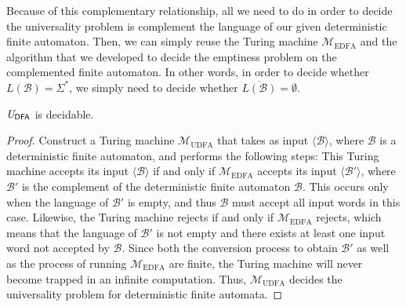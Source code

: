 Because of this complementary relationship, all we need to do in order to decide the universality problem is complement the language of our given deterministic finite automaton. Then, we can simply reuse the Turing machine $\mathcal{M}_{\mathrm{EDFA}}$ and the algorithm that we developed to decide the emptiness problem on the complemented finite automaton. In other words, in order to decide whether $L(\mathcal{B}) = \Sigma^{*}$, we simply need to decide whether $\overline{L(\mathcal{B})} = \emptyset$.

\begin{theorem}\label{thm:UDFAdecidable}
$\mathit{U}_{\textsf{DFA}}$ is decidable.

\begin{proof}
Construct a Turing machine $\mathcal{M}_{\mathrm{UDFA}}$ that takes as input $\langle \mathcal{B} \rangle$, where $\mathcal{B}$ is a deterministic finite automaton, and performs the following steps:
This Turing machine accepts its input $\langle \mathcal{B} \rangle$ if and only if $\mathcal{M}_{\mathrm{EDFA}}$ accepts its input $\langle \mathcal{B}' \rangle$, where $\mathcal{B}'$ is the complement of the deterministic finite automaton $\mathcal{B}$. This occurs only when the language of $\mathcal{B}'$ is empty, and thus $\mathcal{B}$ must accept all input words in this case. Likewise, the Turing machine rejects if and only if $\mathcal{M}_{\mathrm{EDFA}}$ rejects, which means that the language of $\mathcal{B}'$ is not empty and there exists at least one input word not accepted by $\mathcal{B}$. Since both the conversion process to obtain $\mathcal{B}'$ as well as the process of running $\mathcal{M}_{\mathrm{EDFA}}$ are finite, the Turing machine will never become trapped in an infinite computation. Thus, $\mathcal{M}_{\mathrm{UDFA}}$ decides the universality problem for deterministic finite automata.
\end{proof}
\end{theorem}

